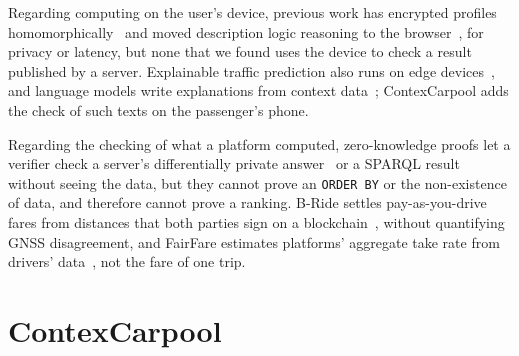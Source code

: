 \documentclass{svproc}
\begin{document}
Regarding computing on the user's device, previous work has encrypted profiles homomorphically~\cite{Nakano2025NewsHE} and moved description logic reasoning to the browser~\cite{Loseto2024TinyME}, for privacy or latency, but none that we found uses the device to check a result published by a server. Explainable traffic prediction also runs on edge devices~\cite{Barbareschi2025EdgeXAI}, and language models write explanations from context data~\cite{BenAbdallah2026LLMExpl}; ContexCarpool adds the check of such texts on the passenger's phone.

Regarding the checking of what a platform computed, zero-knowledge proofs let a verifier check a server's differentially private answer~\cite{Aziz2025ZkCDP} or a SPARQL result~\cite{Braun2026ZkSparql} without seeing the data, but they cannot prove an \texttt{ORDER BY} or the non-existence of data, and therefore cannot prove a ranking. B-Ride settles pay-as-you-drive fares from distances that both parties sign on a blockchain~\cite{Baza2021BRide}, without quantifying GNSS disagreement, and FairFare estimates platforms' aggregate take rate from drivers' data~\cite{Calacci2026FairFare}, not the fare of one trip.

\section{ContexCarpool}\label{sec:arch}
\end{document}
